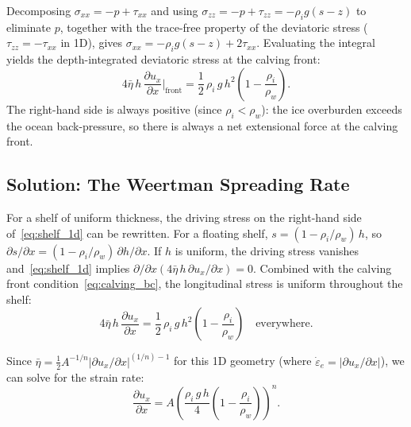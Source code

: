 \documentclass[11pt]{article}
\begin{document}
\medskip
\noindent Decomposing $\sigma_{xx} = -p + \tau_{xx}$ and using $\sigma_{zz} = -p + \tau_{zz} = -\rho_i g(s-z)$ to eliminate $p$, together with the trace-free property of the deviatoric stress ($\tau_{zz} = -\tau_{xx}$ in 1D), gives $\sigma_{xx} = -\rho_i g(s-z) + 2\tau_{xx}$.  Evaluating the integral yields the depth-integrated deviatoric stress at the calving front:
\begin{equation}
  4\bar{\eta}\,h\,\frac{\partial u_x}{\partial x}\bigg|_{\text{front}} = \frac{1}{2}\,\rho_i\,g\,h^2\!\left(1 - \frac{\rho_i}{\rho_w}\right).
  \label{eq:calving_bc}
\end{equation}
The right-hand side is always positive (since $\rho_i < \rho_w$): the ice overburden exceeds the ocean back-pressure, so there is always a net extensional force at the calving front.

\subsection{Solution: The Weertman Spreading Rate}

For a shelf of uniform thickness, the driving stress on the right-hand side of~\eqref{eq:shelf_1d} can be rewritten.  For a floating shelf, $s = (1 - \rho_i/\rho_w)\,h$, so $\partial s/\partial x = (1 - \rho_i/\rho_w)\,\partial h/\partial x$.  If $h$ is uniform, the driving stress vanishes and~\eqref{eq:shelf_1d} implies $\partial/\partial x(4\bar{\eta}\,h\,\partial u_x/\partial x) = 0$.  Combined with the calving front condition~\eqref{eq:calving_bc}, the longitudinal stress is uniform throughout the shelf:
\begin{equation}
  4\bar{\eta}\,h\,\frac{\partial u_x}{\partial x} = \frac{1}{2}\,\rho_i\,g\,h^2\!\left(1 - \frac{\rho_i}{\rho_w}\right) \quad \text{everywhere.}
\end{equation}

\noindent Since $\bar{\eta} = \frac{1}{2}A^{-1/n}|\partial u_x/\partial x|^{(1/n)-1}$ for this 1D geometry (where $\dot{\varepsilon}_e = |\partial u_x/\partial x|$), we can solve for the strain rate:
\begin{equation}
  \boxed{\frac{\partial u_x}{\partial x} = A\!\left(\frac{\rho_i\,g\,h}{4}\left(1 - \frac{\rho_i}{\rho_w}\right)\right)^n.}
  \label{eq:weertman}
\end{equation}
\end{document}
